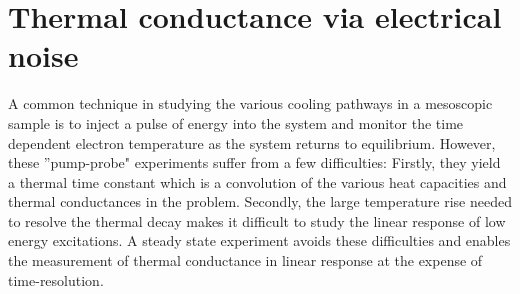 \chapter{Thermal conductance via electrical noise}
\label{ch:thermal_conductance_via_electrical_noise}
A common technique in studying the various cooling pathways in a mesoscopic sample is to inject a pulse of energy into the system and monitor the time dependent electron temperature as the system returns to equilibrium. However, these ''pump-probe" experiments suffer from a few difficulties: Firstly, they yield a thermal time constant which is a convolution of the various heat capacities and thermal conductances in the problem. Secondly, the large temperature rise needed to resolve the thermal decay makes it difficult to study the linear response of low energy excitations. A steady state experiment avoids these difficulties and enables the measurement of thermal conductance in linear response at the expense of time-resolution.

